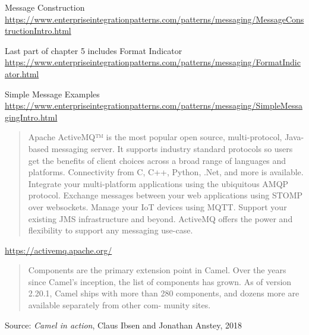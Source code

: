 \documentclass[Screen16to9,17pt]{foils}
\begin{document}

\begin{list2}
\item Message Construction\\{\footnotesize
\url{https://www.enterpriseintegrationpatterns.com/patterns/messaging/MessageConstructionIntro.html}}
\item Last part of chapter 5 includes Format Indicator\\{\footnotesize
\url{https://www.enterpriseintegrationpatterns.com/patterns/messaging/FormatIndicator.html}}
\end{list2}



\begin{list2}
\item Simple Message Examples\\{\footnotesize
\url{https://www.enterpriseintegrationpatterns.com/patterns/messaging/SimpleMessagingIntro.html}}
\end{list2}


\begin{quote}
Apache ActiveMQ™ is the most popular open source, multi-protocol, Java-based messaging server. It supports industry standard protocols so users get the benefits of client choices across a broad range of languages and platforms. Connectivity from C, C++, Python, .Net, and more is available. Integrate your multi-platform applications using the ubiquitous AMQP protocol. Exchange messages between your web applications using STOMP over websockets. Manage your IoT devices using MQTT. Support your existing JMS infrastructure and beyond. ActiveMQ offers the power and flexibility to support any messaging use-case.
\end{quote}

\url{https://activemq.apache.org/}







\begin{quote}
Components are the primary extension point in Camel. Over the years since Camel’s
inception, the list of components has grown. As of version 2.20.1, Camel ships with
more than 280 components, and dozens more are available separately from other com-
munity sites.
\end{quote}
Source: \emph{Camel in action}, Claus Ibsen and Jonathan Anstey, 2018
\end{document}
